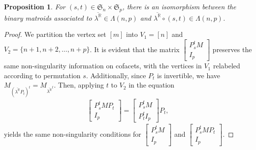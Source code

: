 \documentclass[11pt]{amsart}
\theoremstyle{plain}
\newtheorem{proposition}[theorem]{Proposition}
\numberwithin{equation}{section}
\theoremstyle{definition}
\newcommand{\R}{\mathbb{R}}
\begin{document}
\begin{proposition}\label{prop:IDCM orbit}
	For $(s, t) \in \mathfrak{S}_n \times \mathfrak{S}_p$, there is an isomorphism between the binary matroids associated to $\overline{\lambda^\R} \in \Lambda(n, p)$ and $\overline{\lambda^\R} \circ (s, t) \in \Lambda(n, p)$.
\end{proposition}
\begin{proof}
	We partition the vertex set $[m]$ into $V_1=[n]$ and $V_2=\{n+1, n+2, \ldots, n+p\}$.
	It is evident that the matrix $\begin{bmatrix} P_s^t M \\ I_p \end{bmatrix}$ preserves the same non-singularity information on cofacets, with the vertices in $V_1$ relabeled according to permutation $s$.
	Additionally, since $P_t$ is invertible, we have $M_{(\overline{\lambda^\R}P_t)^t} = M_{\overline{\lambda^\R}^t}$.
	Then, applying $t$ to $V_2$ in the equation
	\begin{align*}
		\begin{bmatrix} P_s^t M P_t \\ I_p \end{bmatrix} = \begin{bmatrix} P_s^t M \\ P_t^t I_p \end{bmatrix} P_t,
	\end{align*}
 yields the same non-singularity conditions for $\begin{bmatrix} P_s^t M \\ I_p \end{bmatrix}$ and $\begin{bmatrix} P_s^t M P_t \\ I_p \end{bmatrix}$.
\end{proof}
\end{document}
